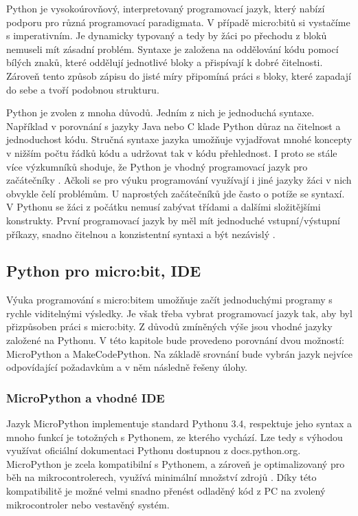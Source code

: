 \documentclass[
  digital,     %
  oneside,     %
  nosansbold,  %
  colorbold, %
  lof,         %
  nolot,         %
]{fithesis4}
\begin{document}
Python je vysokoúrovňový, interpretovaný programovací jazyk, který nabízí podporu pro různá programovací paradigmata. V případě micro:bitů si vystačíme s imperativním. Je dynamicky typovaný a tedy by žáci po přechodu z bloků nemuseli mít zásadní problém. Syntaxe je založena na oddělování kódu pomocí bílých znaků, které oddělují jednotlivé bloky a přispívají k dobré čitelnosti. Zároveň tento způsob zápisu do jisté míry připomíná práci s bloky, které zapadají do sebe a tvoří podobnou strukturu.

Python je zvolen z mnoha důvodů. Jedním z nich je jednoduchá syntaxe. Například v porovnání s jazyky Java nebo C klade Python důraz na čitelnost a jednoduchost kódu. Stručná syntaxe jazyka umožňuje vyjadřovat mnohé koncepty v nižším počtu řádků kódu a udržovat tak v kódu přehlednost. I proto se stále více výzkumníků shoduje, že Python  je vhodný programovací jazyk pro začátečníky \cite{Wainer18, Narayanan19, Lo15}. Ačkoli se pro výuku programování využívají i jiné jazyky žáci v nich obvykle čelí problémům. U naprostých začátečníků jde často o potíže se syntaxí. V Pythonu se žáci z počátku nemusí zabývat třídami a dalšími složitějšími konstrukty. První programovací jazyk by měl mít jednoduché vstupní/výstupní příkazy, snadno čitelnou a konzistentní syntaxi a být nezávislý \cite{Lo15}.

\subsection{Python pro micro:bit, IDE}
Výuka programování s micro:bitem umožňuje začít jednoduchými programy s rychle viditelnými výsledky. Je však třeba vybrat programovací jazyk tak, aby byl přizpůsoben práci s micro:bity. Z důvodů zmíněných výše jsou vhodné jazyky založené na Pythonu. V této kapitole bude provedeno porovnání dvou možností: MicroPython a MakeCodePython. Na základě srovnání bude vybrán jazyk nejvíce odpovídající požadavkům a v něm následně řešeny úlohy. %

\subsubsection{MicroPython a vhodné IDE}
Jazyk MicroPython implementuje standard Pythonu 3.4, respektuje jeho syntax a mnoho funkcí je totožných s Pythonem, ze kterého vychází. Lze tedy s výhodou využívat oficiální dokumentaci Pythonu dostupnou z docs.python.org. MicroPython je zcela kompatibilní s Pythonem, a zároveň je optimalizovaný pro běh na mikrocontrolerech, využívá minimální množství zdrojů \cite{microPython}. Díky této kompatibilitě je možné velmi snadno přenést odladěný kód z PC na zvolený mikrocontroler nebo vestavěný systém.
\end{document}
